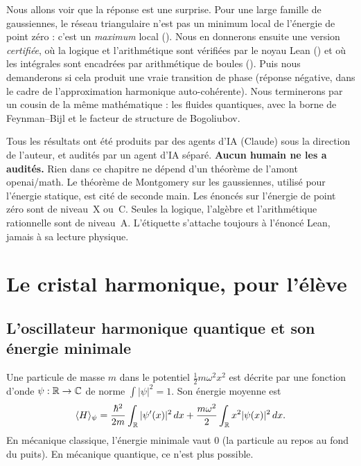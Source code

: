 Nous allons voir que la réponse est une surprise. Pour une large famille de gaussiennes, le réseau triangulaire n'est
pas un minimum local de l'énergie de point zéro : c'est un \emph{maximum} local (\tierX). Nous en donnerons ensuite une
version \emph{certifiée}, où la logique et l'arithmétique sont vérifiées par le noyau Lean (\tierA) et où les intégrales
sont encadrées par arithmétique de boules (\tierC). Puis nous demanderons si cela produit une vraie transition de phase
(réponse négative, dans le cadre de l'approximation harmonique auto-cohérente). Nous terminerons par un cousin de la même
mathématique : les fluides quantiques, avec la borne de Feynman--Bijl et le facteur de structure de Bogoliubov.

\begin{warnbox}
Tous les résultats ont été produits par des agents d'IA (Claude) sous la direction de l'auteur, et audités par un agent
d'IA séparé. \textbf{Aucun humain ne les a audités.} Rien dans ce chapitre ne dépend d'un théorème de l'amont openai/math.
Le théorème de Montgomery sur les gaussiennes, utilisé pour l'énergie statique, est cité de seconde main.
Les énoncés sur l'énergie de point zéro sont de niveau~X ou~C. Seules la logique, l'algèbre et l'arithmétique
rationnelle sont de niveau~A. L'étiquette \tierA{} s'attache toujours à l'énoncé Lean, jamais à sa lecture physique.
\end{warnbox}

\section{Le cristal harmonique, pour l'élève}\label{ch3:sec:cristal}

\subsection{L'oscillateur harmonique quantique et son énergie minimale}\label{ch3:sec:oscillateur}
Une particule de masse $m$ dans le potentiel $\tfrac12m\omega^2x^2$ est décrite par une fonction d'onde
$\psi:\mathbb{R}\to\mathbb{C}$ de norme $\int|\psi|^2=1$. Son énergie moyenne est
\[
\langle H\rangle_\psi=\frac{\hbar^2}{2m}\int_{\mathbb{R}}|\psi'(x)|^2\,dx+\frac{m\omega^2}{2}\int_{\mathbb{R}} x^2|\psi(x)|^2\,dx .
\]
En mécanique classique, l'énergie minimale vaut $0$ (la particule au repos au fond du puits). En mécanique quantique, ce
n'est plus possible.


